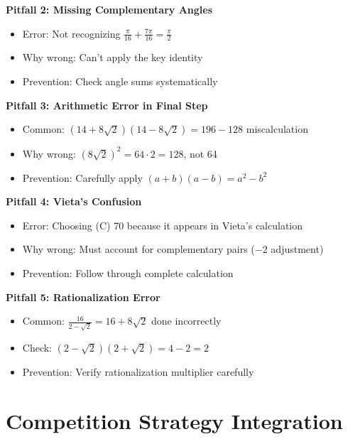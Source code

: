 \documentclass[12pt]{article}
\begin{document}
\begin{solutionbox}
\textbf{Pitfall 2: Missing Complementary Angles}
\begin{itemize}
    \item Error: Not recognizing $\frac{\pi}{16} + \frac{7\pi}{16} = \frac{\pi}{2}$
    \item Why wrong: Can't apply the key identity
    \item Prevention: Check angle sums systematically
\end{itemize}

\textbf{Pitfall 3: Arithmetic Error in Final Step}
\begin{itemize}
    \item Common: $(14+8\sqrt{2})(14-8\sqrt{2}) = 196 - 128$ miscalculation
    \item Why wrong: $(8\sqrt{2})^2 = 64 \cdot 2 = 128$, not 64
    \item Prevention: Carefully apply $(a+b)(a-b) = a^2 - b^2$
\end{itemize}

\textbf{Pitfall 4: Vieta's Confusion}
\begin{itemize}
    \item Error: Choosing (C) 70 because it appears in Vieta's calculation
    \item Why wrong: Must account for complementary pairs ($-2$ adjustment)
    \item Prevention: Follow through complete calculation
\end{itemize}

\textbf{Pitfall 5: Rationalization Error}
\begin{itemize}
    \item Common: $\frac{16}{2-\sqrt{2}} = 16 + 8\sqrt{2}$ done incorrectly
    \item Check: $(2-\sqrt{2})(2+\sqrt{2}) = 4-2 = 2$
    \item Prevention: Verify rationalization multiplier carefully
\end{itemize}

\end{solutionbox}

\section{Competition Strategy Integration}
\end{document}
